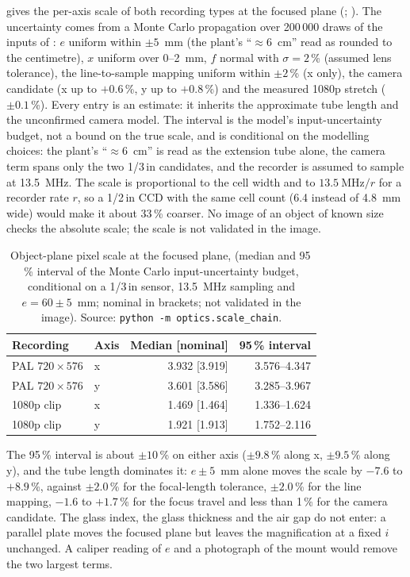  gives the per-axis scale of both recording types at the focused plane
(; ). The uncertainty comes from a Monte Carlo
propagation over 200\,000 draws of the inputs of : $e$ uniform within $\pm 5$~mm (the plant's
``$\approx 6$~cm'' read as rounded to the centimetre), $x$ uniform over 0--2~mm, $f$ normal with $\sigma = 2$\,\%
(assumed lens tolerance), the line-to-sample mapping uniform within $\pm 2$\,\% (x only), the camera candidate
(x up to $+0.6$\,\%, y up to $+0.8$\,\%) and the measured 1080p stretch ($\pm 0.1$\,\%). Every entry is an estimate:
it inherits the approximate tube length and the unconfirmed camera model. The interval is the model's input-uncertainty budget, not
a bound on the true scale, and is conditional on the modelling choices: the plant's ``$\approx 6$~cm'' is read as
the extension tube alone, the camera term spans only the two 1/3\,in candidates, and the recorder is assumed to sample at
13.5~MHz. The scale is proportional to the cell width and to $13.5~\text{MHz}/r$ for a recorder rate $r$, so a
1/2\,in CCD with the same cell count (6.4 instead of 4.8~mm wide) would make it about 33\,\% coarser. No image of an
object of known size checks the absolute scale; the scale is not validated in the image.

\begin{table}
\centering\tabfont
\caption{Object-plane pixel scale at the focused plane, \umpx{} (median and 95\,\% interval of the Monte Carlo
input-uncertainty budget, conditional on a 1/3\,in sensor, 13.5~MHz sampling and $e = 60 \pm 5$~mm; nominal in
brackets; not validated in the image).
Source: \texttt{python -m optics.scale\_chain}.}\label{tab:scale}
\begin{tabular}{@{}llrr@{}}
\toprule
Recording & Axis & Median [nominal] & 95\,\% interval \\
\midrule
PAL $720 \times 576$ & x & 3.932 [3.919] & 3.576--4.347 \\
PAL $720 \times 576$ & y & 3.601 [3.586] & 3.285--3.967 \\
1080p clip & x & 1.469 [1.464] & 1.336--1.624 \\
1080p clip & y & 1.921 [1.913] & 1.752--2.116 \\
\bottomrule
\end{tabular}
\end{table}

The 95\,\% interval is about $\pm 10$\,\% on either axis ($\pm 9.8$\,\% along x, $\pm 9.5$\,\% along y), and the
tube length dominates it: $e \pm 5$~mm alone moves the scale by $-7.6$ to $+8.9$\,\%, against $\pm 2.0$\,\% for the
focal-length tolerance, $\pm 2.0$\,\% for the line mapping, $-1.6$ to $+1.7$\,\% for the focus travel and less than
1\,\% for the camera candidate. The glass index, the glass thickness and the air gap do not enter: a
parallel plate moves the focused plane but leaves the magnification at a fixed $i$ unchanged. A caliper reading of
$e$ and a photograph of the mount would remove the two largest terms.

